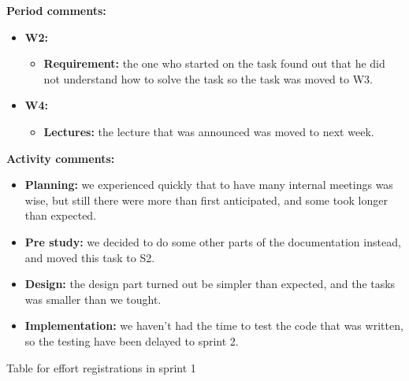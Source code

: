 \begin{table}
\textbf{Period comments:}
\begin{itemize}
\item{}\textbf{W2:} 
\begin{itemize}
\item{}\textbf{Requirement:} the one who started on the task found out that he did not understand how to solve the task so the task was moved to W3. 
\end{itemize}
\item{}\textbf{W4:}
\begin{itemize}
\item{} \textbf{Lectures:} the lecture that was announced was moved to next week. 
\end{itemize}
\end{itemize}


\textbf{Activity comments:}
\begin{itemize}
\item{}\textbf{Planning:} we experienced quickly that to have many internal meetings was wise, but still there were more than first anticipated, and some took longer than expected. 
\item{}\textbf{Pre study:} we decided to do some other parts of the documentation instead, and moved this task to S2. \item{}\textbf{Design:} the design part turned out be simpler than expected, and the tasks was smaller than we tought. \item{}\textbf{Implementation:} we haven't had the time to test the code that was written, so the testing have been delayed to sprint 2.
\end{itemize}
\caption{Table for effort registrations in sprint 1} \label{tab:effortweekss1}
\end{table}